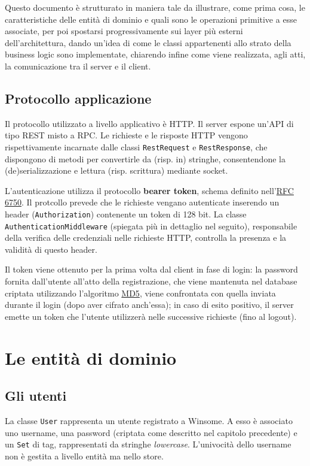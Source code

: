 \documentclass[a4paper,8pt]{article} %
\def\code#1{\texttt{#1}}
\begin{document}
\par Questo documento è strutturato in maniera tale da illustrare, come prima cosa, le caratteristiche delle entità
di dominio e quali sono le operazioni primitive a esse associate, per poi spostarsi progressivamente sui layer
più esterni dell'architettura, dando un'idea di come le classi appartenenti allo strato della business logic sono
implementate, chiarendo infine come viene realizzata, agli atti, la comunicazione tra il server e il client.\\
\subsection{Protocollo applicazione}
Il protocollo utilizzato a livello applicativo è HTTP. Il server espone un'API di tipo REST misto a RPC. Le richieste e le risposte HTTP vengono
rispettivamente incarnate dalle classi \code{RestRequest} e \code{RestResponse}, che dispongono di metodi per convertirle da (risp. in) stringhe, consentendone
la (de)serializzazione e lettura (risp. scrittura) mediante socket.
\par L'autenticazione utilizza il protocollo \textbf{bearer token}, schema definito nell'\href{https://datatracker.ietf.org/doc/html/rfc6750}{RFC 6750}.
Il protcollo prevede che le richieste vengano autenticate inserendo un header (\code{Authorization}) contenente un token di 128 bit.
La classe \code{AuthenticationMiddleware} (spiegata più in dettaglio nel seguito), responsabile della verifica delle credenziali nelle richieste HTTP,
controlla la presenza e la validità di questo header.
\par Il token viene ottenuto per la prima volta dal client in fase di login: la password fornita dall'utente all'atto della registrazione, che viene mantenuta
nel database criptata utilizzando l'algoritmo \href{https://en.wikipedia.org/wiki/MD5}{MD5}, viene confrontata con quella inviata durante il login (dopo aver
cifrato anch'essa); in caso di esito positivo, il server emette un token che l'utente utilizzerà nelle successive richieste (fino al logout).


\section{Le entità di dominio}
\subsection{Gli utenti}
La classe \code{User} rappresenta un utente registrato a Winsome. A esso è associato uno username, una password (criptata come descritto nel capitolo precedente) e un \code{Set} di tag,
rappresentati da stringhe \emph{lowercase}. L'univocità dello username non è gestita a livello entità ma nello store.
\end{document}
